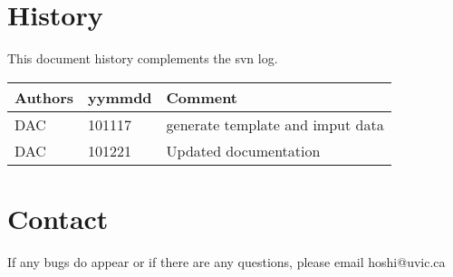 \section{History} 
This document history complements the svn log.

\begin{tabular*}{\textwidth}{lll}
\hline
Authors & yymmdd & Comment \\
\hline
DAC & 101117 & generate template and imput data\\
DAC & 101221 & Updated documentation\\
\hline
\end{tabular*}


\section{Contact}
If any bugs do appear or if there are any questions, please email hoshi@uvic.ca
\begin{verbatim}

\end{verbatim}


%
%
%
%
